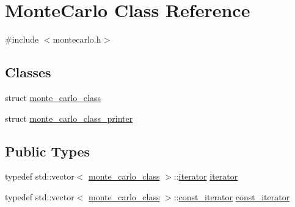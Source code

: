 \hypertarget{classMonteCarlo}{}\section{Monte\+Carlo Class Reference}
\label{classMonteCarlo}


{\ttfamily \#include $<$montecarlo.\+h$>$}

\subsection*{Classes}
\begin{DoxyCompactItemize}
\item 
struct \hyperlink{structMonteCarlo_1_1monte__carlo__class}{monte\+\_\+carlo\+\_\+class}
\item 
struct \hyperlink{structMonteCarlo_1_1monte__carlo__class__printer}{monte\+\_\+carlo\+\_\+class\+\_\+printer}
\end{DoxyCompactItemize}
\subsection*{Public Types}
\begin{DoxyCompactItemize}
\item 
typedef std\+::vector$<$ \hyperlink{structMonteCarlo_1_1monte__carlo__class}{monte\+\_\+carlo\+\_\+class} $>$\+::\hyperlink{classMonteCarlo_a8f83ff48a51d2f19e5c87b8fade7bbe3}{iterator} \hyperlink{classMonteCarlo_a8f83ff48a51d2f19e5c87b8fade7bbe3}{iterator}
\item 
typedef std\+::vector$<$ \hyperlink{structMonteCarlo_1_1monte__carlo__class}{monte\+\_\+carlo\+\_\+class} $>$\+::\hyperlink{classMonteCarlo_a74dc0884e3b02002956de4fb84a0bb01}{const\+\_\+iterator} \hyperlink{classMonteCarlo_a74dc0884e3b02002956de4fb84a0bb01}{const\+\_\+iterator}
\end{DoxyCompactItemize}
